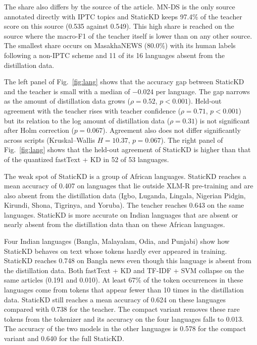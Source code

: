 \documentclass{ieeeaccess}
\begin{document}
The share also differs by the source of the article. MN-DS is the only source annotated directly with IPTC topics and StaticKD keeps 97.4\% of the teacher score on this source (0.535 against 0.549). This high share is reached on the source where the macro-F1 of the teacher itself is lower than on any other source. The smallest share occurs on MasakhaNEWS (80.0\%) with its human labels following a non-IPTC scheme and 11 of its 16 languages absent from the distillation data.

The left panel of Fig.~\ref{fig:lang} shows that the accuracy gap between StaticKD and the teacher is small with a median of $-$0.024 per language. The gap narrows as the amount of distillation data grows ($\rho=0.52$, $p<0.001$). Held-out agreement with the teacher rises with teacher confidence ($\rho=0.71$, $p<0.001$) but its relation to the log amount of distillation data ($\rho=0.31$) is not significant after Holm correction ($p=0.067$). Agreement also does not differ significantly across scripts (Kruskal--Wallis $H=10.37$, $p=0.067$). The right panel of Fig.~\ref{fig:lang} shows that the held-out agreement of StaticKD is higher than that of the quantized fastText + KD in 52 of 53 languages.

The weak spot of StaticKD is a group of African languages. StaticKD reaches a mean accuracy of 0.407 on languages that lie outside XLM-R pre-training and are also absent from the distillation data (Igbo, Luganda, Lingala, Nigerian Pidgin, Kirundi, Shona, Tigrinya, and Yoruba). The teacher reaches 0.643 on the same languages. StaticKD is more accurate on Indian languages that are absent or nearly absent from the distillation data than on these African languages.

Four Indian languages (Bangla, Malayalam, Odia, and Punjabi) show how StaticKD behaves on text whose tokens hardly ever appeared in training. StaticKD reaches 0.748 on Bangla news even though this language is absent from the distillation data. Both fastText + KD and TF-IDF + SVM collapse on the same articles (0.191 and 0.010). At least 67\% of the token occurrences in these languages come from tokens that appear fewer than 10 times in the distillation data. StaticKD still reaches a mean accuracy of 0.624 on these languages compared with 0.738 for the teacher. The compact variant removes these rare tokens from the tokenizer and its accuracy on the four languages falls to 0.013. The accuracy of the two models in the other languages is 0.578 for the compact variant and 0.640 for the full StaticKD.
\end{document}
